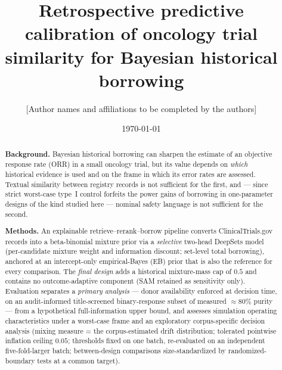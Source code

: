 \documentclass[11pt]{article}
\title{Retrospective predictive calibration of oncology trial similarity
for Bayesian historical borrowing}
\author{[Author names and affiliations to be completed by the authors]}
\date{\today}
\begin{document}
\maketitle

\begin{abstract}
\noindent\textbf{Background.} Bayesian historical borrowing can sharpen the
estimate of an objective response rate (ORR) in a small oncology trial, but
its value depends on \emph{which} historical evidence is used and on the
frame in which its error rates are assessed. Textual similarity between
registry records is not sufficient for the first, and --- since strict
worst-case type~I control forfeits the power gains of borrowing in
one-parameter designs of the kind studied here ---
nominal safety language is not sufficient for the second.

\noindent\textbf{Methods.} An explainable retrieve--rerank--borrow pipeline
converts ClinicalTrials.gov records into a beta-binomial mixture prior via
a \emph{selective} two-head DeepSets model (per-candidate mixture weight
and information discount; set-level total borrowing), anchored at an
intercept-only empirical-Bayes (EB) prior that is also the reference for
every comparison. The \emph{final design} adds a historical mixture-mass
cap of $0.5$ and contains no outcome-adaptive component (SAM retained as
sensitivity only). Evaluation separates a \emph{primary analysis} ---
donor availability enforced at decision time, on an audit-informed
title-screened binary-response subset of measured $\approx 80\%$ purity --- from a
hypothetical full-information upper bound, and assesses simulation
operating characteristics under a worst-case frame and an exploratory
corpus-specific decision analysis (mixing measure = the corpus-estimated
drift distribution; tolerated pointwise inflation ceiling $0.05$;
thresholds fixed on one batch, re-evaluated on an independent
five-fold-larger batch; between-design comparisons size-standardized by
randomized-boundary tests at a common target).


\end{abstract}
\end{document}
